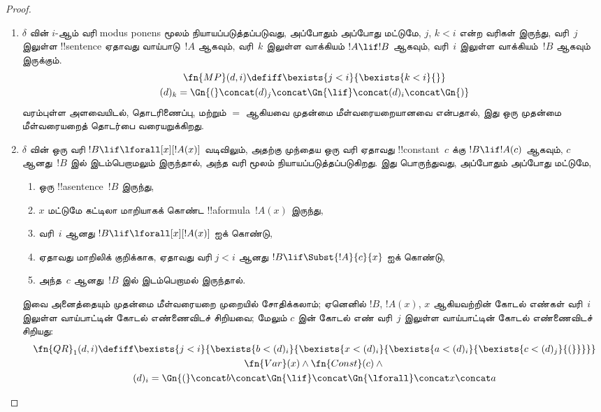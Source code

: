 \documentclass[../../../include/open-logic-section]{subfiles}
\begin{document}
\begin{proof}
\begin{enumerate}
  பண்பை வரையறுக்கிறது.
\item $\delta$ வின் $i$-ஆம் வரி modus ponens மூலம் நியாயப்படுத்தப்படுவது,
  அப்போதும் அப்போது மட்டுமே, $j$, $k < i$ என்ற வரிகள் இருந்து,
  வரி~$j$ இலுள்ள !!{sentence} ஏதாவது வாய்பாடு~$!A$ ஆகவும், வரி~$k$
  இலுள்ள வாக்கியம் $!A \lif !B$ ஆகவும், வரி~$i$ இலுள்ள வாக்கியம்~$!B$
  ஆகவும் இருக்கும்.
  \begin{multline*}
    \fn{MP}(d, i) \defiff \bexists{j < i}{\bexists{k < i}{}}\\
    (d)_k = \Gn{(} \concat (d)_j
      \concat \Gn{\lif} \concat (d)_i \concat \Gn{)}
  \end{multline*}
  வரம்புள்ள அளவையிடல், தொடரிணைப்பு, மற்றும் $=$ ஆகியவை முதன்மை
  மீள்வரையறையானவை என்பதால், இது ஒரு முதன்மை மீள்வரையறைத் தொடர்பை
  வரையறுக்கிறது.
\item $\delta$ வின் ஒரு வரி $!B \lif \lforall[x][!A(x)]$ வடிவிலும்,
  அதற்கு முந்தைய ஒரு வரி ஏதாவது !!{constant}~$c$ க்கு
  $!B \lif !A(c)$ ஆகவும், $c$ ஆனது~$!B$ இல் இடம்பெறாமலும் இருந்தால், அந்த
  வரி \QR{} மூலம் நியாயப்படுத்தப்படுகிறது. இது பொருந்துவது, அப்போதும்
  அப்போது மட்டுமே,
  \begin{enumerate}
  \item ஒரு !!a{sentence}~$!B$ இருந்து,
  \item $x$ மட்டுமே கட்டிலா மாறியாகக் கொண்ட !!a{formula}~$!A(x)$ இருந்து,
  \item வரி~$i$ ஆனது $!B \lif \lforall[x][!A(x)]$ ஐக் கொண்டு,
  \item ஏதாவது மாறிலிக் குறிக்காக, ஏதாவது வரி $j < i$ ஆனது
    $!B \lif \Subst{!A}{c}{x}$ ஐக் கொண்டு,
  \item அந்த~$c$ ஆனது~$!B$ இல் இடம்பெறாமல் இருந்தால்.
  \end{enumerate}
  இவை அனைத்தையும் முதன்மை மீள்வரையறை முறையில் சோதிக்கலாம்; ஏனெனில்
  $!B$, $!A(x)$, $x$ ஆகியவற்றின் கோடல் எண்கள் வரி~$i$ இலுள்ள வாய்பாட்டின்
  கோடல் எண்ணைவிடச் சிறியவை; மேலும் $c$ இன் கோடல் எண் வரி~$j$ இலுள்ள
  வாய்பாட்டின் கோடல் எண்ணைவிடச் சிறியது:
  \begin{multline*}
    \fn{QR}_1(d, i) \defiff \bexists{j<i}{\bexists{b < (d)_i}{\bexists{x <
        (d)_i}{\bexists{a < (d)_i}{\bexists{c < (d)_j}{(}}}}}
    \\ \fn{Var}(x) \land \fn{Const}(c) \land {} \\
    (d)_i = \Gn{(} \concat
    b \concat \Gn{\lif} \concat \Gn{\lforall} \concat x \concat a

\end{multline*}
\end{enumerate}
\end{proof}
\end{document}
